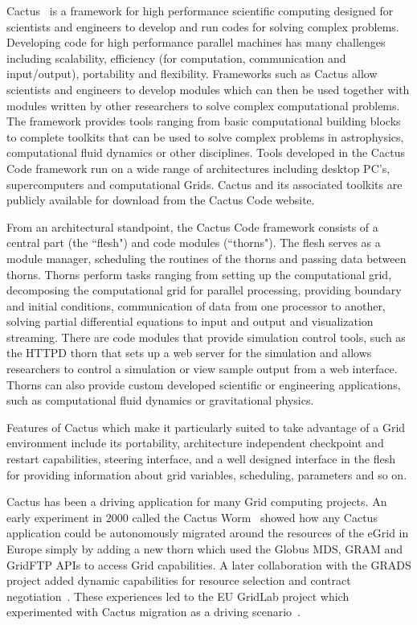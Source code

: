\documentclass[conference,final]{IEEEtran}
\begin{document}
Cactus~\cite{X0} is a framework for high performance scientific
computing designed for scientists and engineers to develop and run
codes for solving complex problems.  Developing code for high
performance parallel machines has many challenges including
scalability, efficiency (for computation, communication and
input/output), portability and flexibility. Frameworks such as Cactus
allow scientists and engineers to develop modules which can then be
used together with modules written by other researchers to solve
complex computational problems. The framework provides tools ranging
from basic computational building blocks to complete toolkits that can
be used to solve complex problems in astrophysics, computational fluid
dynamics or other disciplines.  Tools developed in the Cactus Code
framework run on a wide range of architectures including desktop PC's,
supercomputers and computational Grids. Cactus and its associated
toolkits are publicly available for download from the Cactus Code
website.

From an architectural standpoint, the Cactus Code framework consists
of a central part (the ``flesh") and code modules (``thorns").  The
flesh serves as a module manager, scheduling the routines of the
thorns and passing data between thorns.  Thorns perform tasks ranging
from setting up the computational grid, decomposing the computational
grid for parallel processing, providing boundary and initial
conditions, communication of data from one processor to another,
solving partial differential equations to input and output and
visualization streaming. There are code modules that provide
simulation control tools, such as the HTTPD thorn that sets up a web
server for the simulation and allows researchers to control a
simulation or view sample output from a web interface.  Thorns can
also provide custom developed scientific or engineering applications,
such as computational fluid dynamics or gravitational physics.

Features of Cactus which make it particularly suited to take advantage
of a Grid environment include its portability, architecture
independent checkpoint and restart capabilities, steering interface,
and a well designed interface in the flesh for providing information
about grid variables, scheduling, parameters and so on.

Cactus has been a driving application for many Grid computing
projects.  An early experiment in 2000 called the Cactus
Worm~\cite{X1} showed how any Cactus application could be autonomously
migrated around the resources of the eGrid in Europe simply by adding
a new thorn which used the Globus MDS, GRAM and GridFTP APIs to access
Grid capabilities. A later collaboration with the GRADS project added
dynamic capabilities for resource selection and contract
negotiation~\cite{X2}.  These experiences led to the EU GridLab
project which experimented with Cactus migration as a driving
scenario~\cite{X3}.
\end{document}
